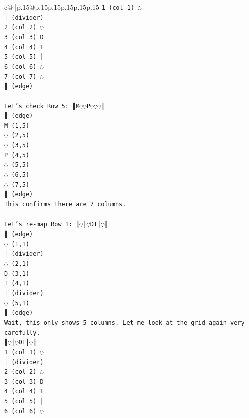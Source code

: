 \documentclass{article}
\begin{document}
{\begin{supertabular}{c@{$\;$}|p{.15\linewidth}@{}p{.15\linewidth}p{.15\linewidth}p{.15\linewidth}p{.15\linewidth}p{.15\linewidth}}
{{{\texttt{1 (col 1) ◌} \\
\texttt{│ (divider)} \\
\texttt{2 (col 2) ◌} \\
\texttt{3 (col 3) D} \\
\texttt{4 (col 4) T} \\
\texttt{5 (col 5) │} \\
\texttt{6 (col 6) ◌} \\
\texttt{7 (col 7) ◌} \\
\texttt{║ (edge)} \\
\\ 
\texttt{Let's check Row 5: ║M◌◌P◌◌◌║} \\
\texttt{║ (edge)} \\
\texttt{M (1,5)} \\
\texttt{◌ (2,5)} \\
\texttt{◌ (3,5)} \\
\texttt{P (4,5)} \\
\texttt{◌ (5,5)} \\
\texttt{◌ (6,5)} \\
\texttt{◌ (7,5)} \\
\texttt{║ (edge)} \\
\texttt{This confirms there are 7 columns.} \\
\\ 
\texttt{Let's re{-}map Row 1: ║◌│◌DT│◌║} \\
\texttt{║ (edge)} \\
\texttt{◌ (1,1)} \\
\texttt{│ (divider)} \\
\texttt{◌ (2,1)} \\
\texttt{D (3,1)} \\
\texttt{T (4,1)} \\
\texttt{│ (divider)} \\
\texttt{◌ (5,1)} \\
\texttt{║ (edge)} \\
\texttt{Wait, this only shows 5 columns. Let me look at the grid again very carefully.} \\
\texttt{║◌│◌DT│◌║} \\
\texttt{1 (col 1) ◌} \\
\texttt{│ (divider)} \\
\texttt{2 (col 2) ◌} \\
\texttt{3 (col 3) D} \\
\texttt{4 (col 4) T} \\
\texttt{5 (col 5) │} \\
\texttt{6 (col 6) ◌} \\
}}}
\end{supertabular}}
\end{document}
